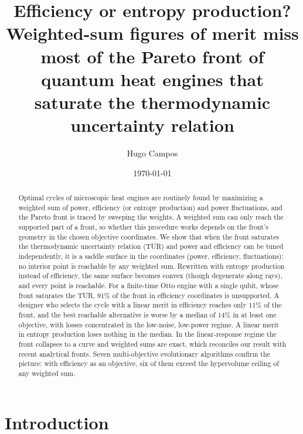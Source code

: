 \documentclass[pre,twocolumn,superscriptaddress,nofootinbib,longbibliography]{revtex4-2}
\begin{document}
\title{Efficiency or entropy production? Weighted-sum figures of merit miss most of the
Pareto front of quantum heat engines that saturate the thermodynamic uncertainty relation}

\author{Hugo Campos}

\date{\today}

\begin{abstract}
Optimal cycles of microscopic heat engines are routinely found by maximizing a weighted sum of
power, efficiency (or entropy production) and power fluctuations, and the Pareto front is traced
by sweeping the weights. A weighted sum can only reach the supported part of a front, so whether
this procedure works depends on the front's geometry in the chosen objective coordinates. We show
that when the front saturates the thermodynamic uncertainty relation (TUR) and power and efficiency
can be tuned independently, it is a saddle surface in the coordinates (power, efficiency,
fluctuations): no interior point is reachable by any weighted sum. Rewritten with entropy
production instead of efficiency, the same surface becomes convex (though degenerate along rays),
and every point is reachable. For a finite-time Otto engine with a single qubit, whose front
saturates the TUR, $91\%$ of the front in efficiency coordinates is unsupported. A designer who
selects the cycle with a linear merit in efficiency reaches only $11\%$ of the front, and the best
reachable alternative is worse by a median of $14\%$ in at least one objective, with losses
concentrated in the low-noise, low-power regime. A linear merit in entropy production loses
nothing in the median. In the linear-response regime the front collapses to a curve and weighted
sums are exact, which reconciles our result with recent analytical fronts. Seven multi-objective
evolutionary algorithms confirm the picture: with efficiency as an objective, six of them exceed
the hypervolume ceiling of any weighted sum.
\end{abstract}

\maketitle

\section{Introduction}
\end{document}
